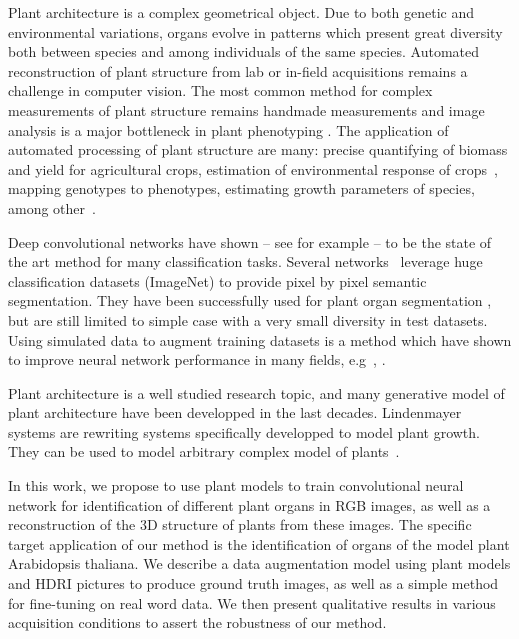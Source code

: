 Plant architecture is a complex geometrical object. Due to both genetic and
environmental variations, organs evolve in patterns which present great diversity
both between species and among individuals of the same species. Automated
reconstruction of plant structure from lab or in-field acquisitions remains a challenge in computer
vision. The most common method for complex measurements of plant structure
remains handmade measurements and image analysis is a major bottleneck in plant phenotyping
\cite{minervini2015image}. The application of automated processing of plant structure are many: precise
quantifying of biomass and yield for agricultural crops, estimation of environmental response
of crops~\cite{peirone2018assessing, srivastava2017drought},  mapping genotypes to
phenotypes, estimating growth parameters of species, among other~\cite{denis1998symmetry}.

Deep convolutional networks have shown -- see for example \cite{krizhevsky2012imagenet} --
to be the state of the art method for many classification tasks. Several
networks~\cite{ronneberger2015u, long2015fully} leverage huge classification datasets (ImageNet) to provide pixel by
pixel semantic segmentation. They have been successfully used for plant organ
segmentation \cite{shi2019plant}, but are still limited to simple case with a very
small diversity in test datasets. Using simulated data to augment training
datasets is a method which have shown to improve neural network performance in
many fields, e.g~\cite{qiu2016unrealcv}, \cite{alhaija2018augmented}.

Plant architecture is a well studied research topic, and many generative model
of plant architecture have been developped in the last decades. Lindenmayer
systems are rewriting systems specifically developped to model plant growth.
They can be used to model arbitrary complex model of plants~\cite{boudon_l-py:_2012}.

In this work, we propose to use plant models to train convolutional neural network for
identification of different plant organs in RGB images, as well as a
reconstruction of the 3D structure of plants from these images. The specific target application of
our method is the identification of organs of the model plant Arabidopsis
thaliana. We describe a data augmentation model using plant models and HDRI
pictures to produce ground truth images, as well as a simple method for
fine-tuning on real word data. We then present qualitative results in various
acquisition conditions to assert the robustness of our method. 
